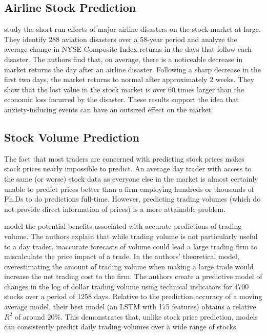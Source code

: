 \documentclass[12pt]{article}
\begin{document}
\subsection{Airline Stock Prediction}
\citet{kaplanski2010sentiment} study the short-run effects of major airline disasters on the stock market at large. They identify 288 aviation disasters over a 58-year period and analyze the average change in NYSE Composite Index returns in the days that follow each disaster. The authors find that, on average, there is a noticeable decrease in market returns the day after an airline disaster. Following a sharp decrease in the first two days, the market returns to normal after approximately 2 weeks. They show that the lost value in the stock market is over 60 times larger than the economic loss incurred by the disaster. These results support the idea that anxiety-inducing events can have an outsized effect on the market.

\subsection{Stock Volume Prediction}
The fact that most traders are concerned with predicting stock prices makes stock prices nearly impossible to predict. An average day trader with access to the same (or worse) stock data as everyone else in the market is almost certainly unable to predict prices better than a firm employing hundreds or thousands of Ph.Ds to do predictions full-time. However, predicting trading volumes (which do not provide direct information of prices) is a more attainable problem.

\citet{goyenko2024trading} model the potential benefits associated with accurate predictions of trading volume. The authors explain that while trading volume is not particularly useful to a day trader, inaccurate forecasts of volume could lead a large trading firm to miscalculate the price impact of a trade. In the authors' theoretical model, overestimating the amount of trading volume when making a large trade would increase the net trading cost to the firm. The authors create a predictive model of changes in the log of dollar trading volume using technical indicators for 4700 stocks over a period of 1258 days. Relative to the prediction accuracy of a moving average model, their best model (an LSTM with 175 features) obtains a relative $R^2$ of around 20\%. This demonstrates that, unlike stock price prediction, models can consistently predict daily trading volumes over a wide range of stocks.
\end{document}
